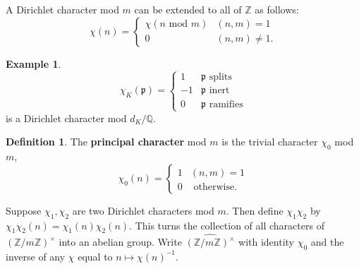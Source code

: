 \documentclass{article}
\theoremstyle{definition}
\newtheorem{example}{Example}[section]
\newtheorem{defn}[theorem]{Definition}
\begin{document}
A Dirichlet character mod $m$ can be extended to all of $\mathbb{Z}$ as follows:
\[
\chi(n) = \begin{cases}
    \chi(n \text{ mod }m) &(n,m)=1\\
    0 &(n,m) \neq 1.
\end{cases}
\]
\begin{example}
    \[
        \chi_K(\mathfrak{p}) = \begin{cases}
        1 & \mathfrak{p} \text{ splits}\\
        -1 & \mathfrak{p} \text{ inert}\\
        0 & \mathfrak{p} \text{ ramifies}
        \end{cases}
    \]
    is a Dirichlet character mod $d_K/\mathbb{Q}$.
\end{example}
\begin{defn}\label{defn2.27}
    The \textbf{principal character} mod $m$ is the trivial character $\chi_0$ mod $m$,
    \[
    \chi_0(n) = \begin{cases}
        1 & (n,m)=1\\
        0 & \text{ otherwise}.
    \end{cases}
    \]
\end{defn}
Suppose $\chi_1, \chi_2$ are two Dirichlet characters mod $m$. Then define $\chi_1\chi_2$ by $\chi_1\chi_2(n)=\chi_1(n)\chi_2(n)$. This turns the collection of all characters of $(\mathbb{Z}/m\mathbb{Z})^\times$ into an abelian group. Write $\widehat{(\mathbb{Z}/m\mathbb{Z})^\times}$ with identity $\chi_0$ and the inverse of any $\chi$ equal to $n \mapsto \chi(n)^{-1}$.
\vspace{1mm}
 
\end{document}
